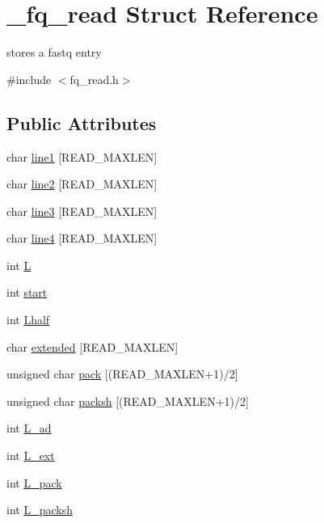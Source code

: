 \hypertarget{struct__fq__read}{\section{\+\_\+fq\+\_\+read Struct Reference}
\label{struct__fq__read}
}


stores a fastq entry  




{\ttfamily \#include $<$fq\+\_\+read.\+h$>$}

\subsection*{Public Attributes}
\begin{DoxyCompactItemize}
\item 
char \hyperlink{struct__fq__read_a7a643c49516b3a35f221d0fcda7f9ff3}{line1} \mbox{[}R\+E\+A\+D\+\_\+\+M\+A\+X\+L\+E\+N\mbox{]}
\item 
char \hyperlink{struct__fq__read_af2502a6f97e9508936c1b9f08890cc84}{line2} \mbox{[}R\+E\+A\+D\+\_\+\+M\+A\+X\+L\+E\+N\mbox{]}
\item 
char \hyperlink{struct__fq__read_a3df48e8dc31e47dc36c371002dba1bb5}{line3} \mbox{[}R\+E\+A\+D\+\_\+\+M\+A\+X\+L\+E\+N\mbox{]}
\item 
char \hyperlink{struct__fq__read_a8074fd734cb7e3d4b87454417aea569a}{line4} \mbox{[}R\+E\+A\+D\+\_\+\+M\+A\+X\+L\+E\+N\mbox{]}
\item 
int \hyperlink{struct__fq__read_a746efa9093b5223e85ffb7274e7693ef}{L}
\item 
int \hyperlink{struct__fq__read_a0b8deb6c25c72026b4928b17e3f12ade}{start}
\item 
int \hyperlink{struct__fq__read_a9cf08b81f1e78553e08fb597d30192b6}{Lhalf}
\item 
char \hyperlink{struct__fq__read_aae3ecb937cbba51f91baa391d8d84826}{extended} \mbox{[}R\+E\+A\+D\+\_\+\+M\+A\+X\+L\+E\+N\mbox{]}
\item 
unsigned char \hyperlink{struct__fq__read_afd023930012710b1a015ef78a02b3721}{pack} \mbox{[}(R\+E\+A\+D\+\_\+\+M\+A\+X\+L\+E\+N+1)/2\mbox{]}
\item 
unsigned char \hyperlink{struct__fq__read_a8c9786c5779078561abe5ec2e06c7ff9}{packsh} \mbox{[}(R\+E\+A\+D\+\_\+\+M\+A\+X\+L\+E\+N+1)/2\mbox{]}
\item 
int \hyperlink{struct__fq__read_a61c338fcae059e8581b02ec1b2cdcdc6}{L\+\_\+ad}
\item 
int \hyperlink{struct__fq__read_acf9a80768c42f71a975d602058e2ab52}{L\+\_\+ext}
\item 
int \hyperlink{struct__fq__read_a84f64405e7a9bbc055dd4f5534041782}{L\+\_\+pack}
\item 
int \hyperlink{struct__fq__read_a1303e633bdb4a7e31083d849a92fcbcc}{L\+\_\+packsh}
\end{DoxyCompactItemize}


